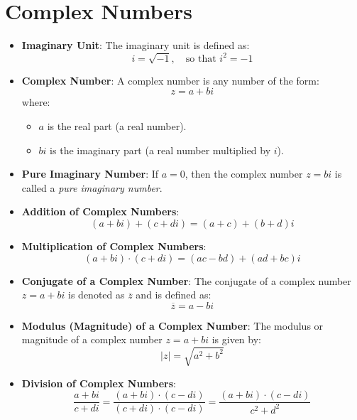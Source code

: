 \documentclass{article}
\begin{document}
\section*{Complex Numbers}

\begin{itemize}
    \item \textbf{Imaginary Unit}: The imaginary unit is defined as:
        \[
        i = \sqrt{-1}, \quad \text{so that } i^2 = -1
        \]
    
    \item \textbf{Complex Number}: A complex number is any number of the form:
        \[
        z = a + bi
        \]
        where:
        \begin{itemize}
            \item \( a \) is the real part (a real number).
            \item \( bi \) is the imaginary part (a real number multiplied by \( i \)).
        \end{itemize}
    
    \item \textbf{Pure Imaginary Number}: If \( a = 0 \), then the complex number \( z = bi \) is called a \textit{pure imaginary number}.
    
    \item \textbf{Addition of Complex Numbers}:
        \[
        (a + bi) + (c + di) = (a + c) + (b + d)i
        \]
    
    \item \textbf{Multiplication of Complex Numbers}:
        \[
        (a + bi) \cdot (c + di) = (ac - bd) + (ad + bc)i
        \]
    
    \item \textbf{Conjugate of a Complex Number}: The conjugate of a complex number \( z = a + bi \) is denoted as \( \overline{z} \) and is defined as:
        \[
        \overline{z} = a - bi
        \]
    
    \item \textbf{Modulus (Magnitude) of a Complex Number}: The modulus or magnitude of a complex number \( z = a + bi \) is given by:
        \[
        |z| = \sqrt{a^2 + b^2}
        \]
    
    \item \textbf{Division of Complex Numbers}:
        \[
        \frac{a + bi}{c + di} = \frac{(a + bi) \cdot (c - di)}{(c + di) \cdot (c - di)} = \frac{(a + bi) \cdot (c - di)}{c^2 + d^2}
        \]
\end{itemize}
\end{document}

